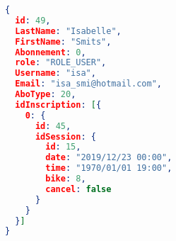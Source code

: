 \begin{lstlisting}[language=json,firstnumber=1]
{
  id: 49,
  LastName: "Isabelle",
  FirstName: "Smits",
  Abonnement: 0,
  role: "ROLE_USER",
  Username: "isa",
  Email: "isa_smi@hotmail.com",
  AboType: 20,
  idInscription: [{
  	0: {
      id: 45,
      idSession: {
        id: 15,
	    date: "2019/12/23 00:00",
	    time: "1970/01/01 19:00",
	    bike: 8,
	    cancel: false
	  }
    }
  }]
}
\end{lstlisting}